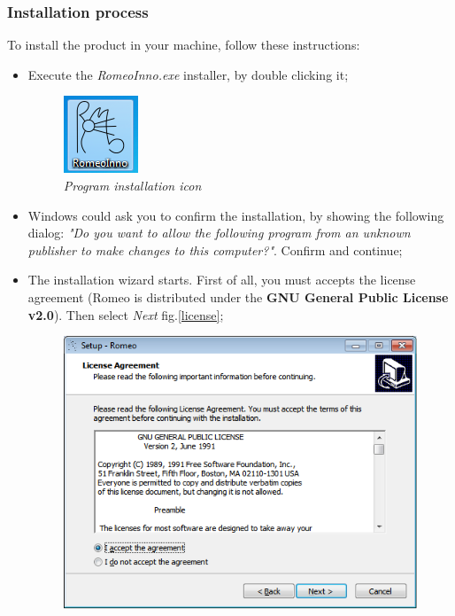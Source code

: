\subsubsection{Installation process}
\label{installationpriocess}
To install the product in your machine, follow these instructions:
\begin{itemize}
\item Execute the \textit{RomeoInno.exe} installer, by double clicking it;
\begin{figure}[!h]
\begin{center}
\includegraphics[scale=1]{./Images/icon}
\caption{\textit{Program installation icon}}
\label{visualizesubjectimg}
\end{center}
\end{figure}
\item Windows could ask you to confirm the installation, by showing the following dialog: \textit{"Do you want to allow the following program from an unknown publisher to make changes to this computer?"}. Confirm and continue;
\item The installation wizard starts. First of all, you must accepts the license agreement (Romeo is distributed under the \textbf{GNU General Public License v2.0}). Then select \textit{Next} fig.\ref{license};
\begin{figure}[!h]
\begin{center}
\includegraphics[scale=0.7]{./Images/licenza}

\end{center}
\end{figure}
\end{itemize}
